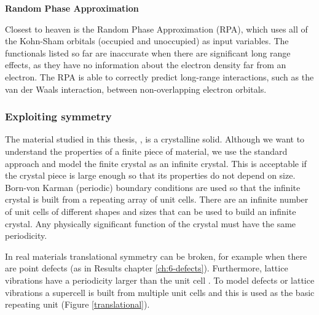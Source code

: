  
\textbf{Random Phase Approximation} 

Closest to heaven is the Random Phase Approximation (RPA), which uses all of the Kohn-Sham orbitals (occupied and unoccupied) as input variables. The functionals listed so far are inaccurate when there are significant long range effects, as they have no information about the electron density far from an electron. The RPA is able to correctly predict long-range interactions, such as the van der Waals interaction, between non-overlapping electron orbitals.

\subsubsection{Exploiting symmetry}

The material studied in this thesis, , is a crystalline solid. Although we want to understand the properties of a finite piece of material, we use the standard approach and model the finite crystal as an infinite crystal. This is acceptable if the crystal piece is large enough so that its properties do not depend on size. Born-von Karman (periodic) boundary conditions are used so that the infinite crystal is built from a repeating array of unit cells. There are an infinite number of unit cells of different shapes and sizes that can be used to build an infinite crystal. Any physically significant function of the crystal must have the same periodicity.

In real materials translational symmetry can be broken, for example when there are point defects (as in Results chapter \ref{ch:6-defects}). Furthermore, lattice vibrations have a periodicity larger than the unit cell . To model defects or lattice vibrations a supercell is built from multiple unit cells and this is used as the basic repeating unit (Figure \ref{translational}).

